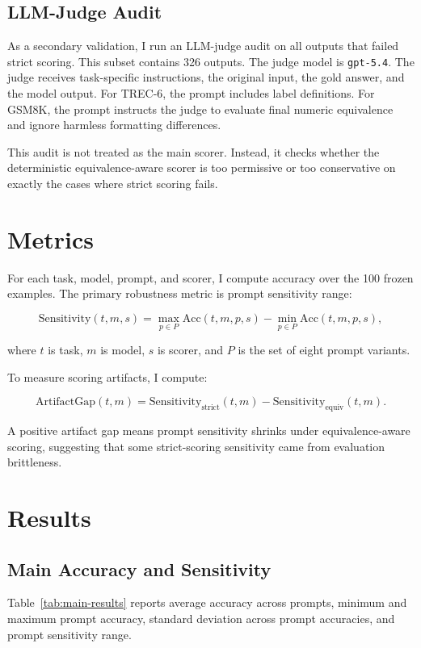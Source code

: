 \documentclass[11pt]{article}
\begin{document}
\subsection{LLM-Judge Audit}

As a secondary validation, I run an LLM-judge audit on all outputs that failed strict scoring. This subset contains 326 outputs. The judge model is \texttt{gpt-5.4}. The judge receives task-specific instructions, the original input, the gold answer, and the model output. For TREC-6, the prompt includes label definitions. For GSM8K, the prompt instructs the judge to evaluate final numeric equivalence and ignore harmless formatting differences.

This audit is not treated as the main scorer. Instead, it checks whether the deterministic equivalence-aware scorer is too permissive or too conservative on exactly the cases where strict scoring fails.

\section{Metrics}

For each task, model, prompt, and scorer, I compute accuracy over the 100 frozen examples. The primary robustness metric is prompt sensitivity range:

\[
\text{Sensitivity}(t,m,s) =
\max_{p \in P} \text{Acc}(t,m,p,s)
- \min_{p \in P} \text{Acc}(t,m,p,s),
\]

where $t$ is task, $m$ is model, $s$ is scorer, and $P$ is the set of eight prompt variants.

To measure scoring artifacts, I compute:

\[
\text{ArtifactGap}(t,m) =
\text{Sensitivity}_{\text{strict}}(t,m)
- \text{Sensitivity}_{\text{equiv}}(t,m).
\]

A positive artifact gap means prompt sensitivity shrinks under equivalence-aware scoring, suggesting that some strict-scoring sensitivity came from evaluation brittleness.

\section{Results}

\subsection{Main Accuracy and Sensitivity}

Table~\ref{tab:main-results} reports average accuracy across prompts, minimum and maximum prompt accuracy, standard deviation across prompt accuracies, and prompt sensitivity range.
\end{document}
